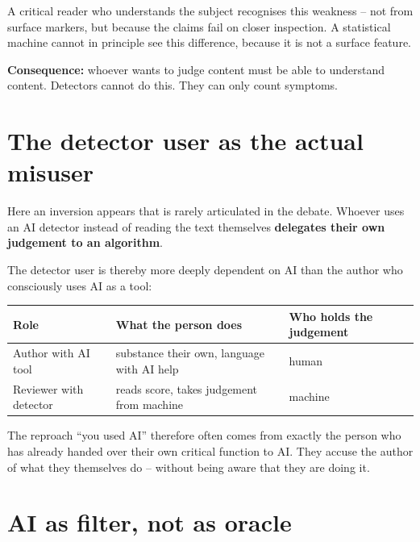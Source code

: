A critical reader who understands the subject recognises this
weakness -- not from surface markers, but because the claims fail
on closer inspection. A statistical machine cannot in principle see
this difference, because it is not a surface feature.

\textbf{Consequence:} whoever wants to judge content must be able
to understand content. Detectors cannot do this. They can only
count symptoms.

\section{The detector user as the actual misuser}

Here an inversion appears that is rarely articulated in the debate.
Whoever uses an AI detector instead of reading the text themselves
\textbf{delegates their own judgement to an algorithm}.

The detector user is thereby more deeply dependent on AI than the
author who consciously uses AI as a tool:

\begin{center}
\renewcommand{\arraystretch}{1.4}
{\small
\begin{tabular}{>{\raggedright\arraybackslash}p{3.4cm}>{\raggedright\arraybackslash}p{3.6cm}>{\raggedright\arraybackslash}p{3.4cm}}
\toprule
\textbf{Role} & \textbf{What the person does} & \textbf{Who holds the judgement} \\
\midrule
Author with AI tool & substance their own, language with AI help & human \\[3pt]
Reviewer with detector & reads score, takes judgement from machine & machine \\
\bottomrule
\end{tabular}
}
\renewcommand{\arraystretch}{1.0}
\end{center}

The reproach \enquote{you used AI} therefore often comes from
exactly the person who has already handed over their own critical
function to AI. They accuse the author of what they themselves do
-- without being aware that they are doing it.

\section{AI as filter, not as oracle}

